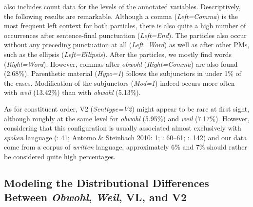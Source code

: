  also includes count data for the levels of the annotated variables. Descriptively, the following results are remarkable. Although a comma (\textit{Left=Comma}) is the most frequent left context for both particles, there is also quite a high number of occurrences after sentence-final punctuation (\textit{Left=End}). The particles also occur without any preceding punc\-tuation at all (\textit{Left=Word}) as well as after other PMs, such as the ellipsis (\textit{Left=Ellipsis}). After the particles, we mostly find words (\textit{Right=Word}). However, commas after \textit{obwohl} (\textit{Right=Comma}) are also found (2.68\%). Parenthetic material (\textit{Hypo=1}) follows the subjunc\-tors in under 1\% of the cases. Modification of the subjunctors (\textit{Mod=1}) indeed occurs more often with \textit{weil} (13.42\%) than with \textit{obwohl} (5.13\%).



As for constituent order, V2 (\textit{Sent\-type=V2}) might appear to be rare at first sight, although roughly at the same level for \textit{obwohl} (5.95\%) and \textit{weil} (7.17\%). However, considering that this configuration is usually associated almost exclusively with \textit{spoken} language (\citealt{GohlGünthner1999}: 41; Antomo \& Stein\-bach 2010: 1; \citealt{Freywald2010}: 60–61; \citealt{Schwitalla2012}:~142) and our data come from a corpus of \textit{written} lan\-guage, approximately 6\% and 7\% should rather be considered quite high percent\-ages.





\subsection{Modeling the Distributional Differences Between \textit{Obwohl}, \textit{Weil}, VL, and V2}



